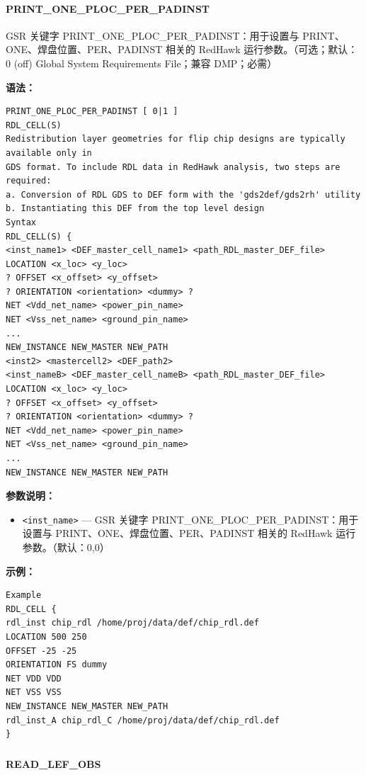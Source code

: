 \paragraph*{PRINT_ONE_PLOC_PER_PADINST}

GSR 关键字 PRINT_ONE_PLOC_PER_PADINST：用于设置与 PRINT、ONE、焊盘位置、PER、PADINST 相关的 RedHawk 运行参数。（可选；默认：0 (off) Global System Requirements File；兼容 DMP；必需）

\textbf{语法：}
\begin{lstlisting}
PRINT_ONE_PLOC_PER_PADINST [ 0|1 ]
RDL_CELL(S)
Redistribution layer geometries for flip chip designs are typically available only in
GDS format. To include RDL data in RedHawk analysis, two steps are required:
a. Conversion of RDL GDS to DEF form with the 'gds2def/gds2rh' utility
b. Instantiating this DEF from the top level design
Syntax
RDL_CELL(S) {
<inst_name1> <DEF_master_cell_name1> <path_RDL_master_DEF_file>
LOCATION <x_loc> <y_loc>
? OFFSET <x_offset> <y_offset>
? ORIENTATION <orientation> <dummy> ?
NET <Vdd_net_name> <power_pin_name>
NET <Vss_net_name> <ground_pin_name>
...
NEW_INSTANCE NEW_MASTER NEW_PATH
<inst2> <mastercell2> <DEF_path2>
<inst_nameB> <DEF_master_cell_nameB> <path_RDL_master_DEF_file>
LOCATION <x_loc> <y_loc>
? OFFSET <x_offset> <y_offset>
? ORIENTATION <orientation> <dummy> ?
NET <Vdd_net_name> <power_pin_name>
NET <Vss_net_name> <ground_pin_name>
...
NEW_INSTANCE NEW_MASTER NEW_PATH
\end{lstlisting}

\textbf{参数说明：}
\begin{itemize}
\item \texttt{<inst\_name>} — GSR 关键字 PRINT\_ONE\_PLOC\_PER\_PADINST：用于设置与 PRINT、ONE、焊盘位置、PER、PADINST 相关的 RedHawk 运行参数。（默认：0,0）
\end{itemize}

\textbf{示例：}
\begin{lstlisting}
Example
RDL_CELL {
rdl_inst chip_rdl /home/proj/data/def/chip_rdl.def
LOCATION 500 250
OFFSET -25 -25
ORIENTATION FS dummy
NET VDD VDD
NET VSS VSS
NEW_INSTANCE NEW_MASTER NEW_PATH
rdl_inst_A chip_rdl_C /home/proj/data/def/chip_rdl.def
}
\end{lstlisting}

\subsubsection{}
\paragraph*{READ_LEF_OBS}

